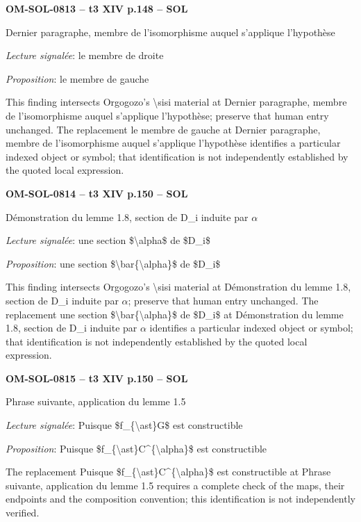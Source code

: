 \par\noindent\textbf{OM-SOL-0813 -- t3 XIV p.148 -- SOL}\par
Dernier paragraphe, membre de l'isomorphisme auquel s'applique l'hypothèse\par
\emph{Lecture signalée}: le membre de droite\par
\emph{Proposition}: le membre de gauche\par
This finding intersects Orgogozo's \textbackslash{}sisi material at Dernier paragraphe, membre de l'isomorphisme auquel s'applique l'hypothèse; preserve that human entry unchanged. The replacement le membre de gauche at Dernier paragraphe, membre de l'isomorphisme auquel s'applique l'hypothèse identifies a particular indexed object or symbol; that identification is not independently established by the quoted local expression.\par
\par\noindent\textbf{OM-SOL-0814 -- t3 XIV p.150 -- SOL}\par
Démonstration du lemme 1.8, section de D\_i induite par \ensuremath{\alpha}\par
\emph{Lecture signalée}: une section \$\textbackslash{}alpha\$ de \$D\_i\$\par
\emph{Proposition}: une section \$\textbackslash{}bar\{\textbackslash{}alpha\}\$ de \$D\_i\$\par
This finding intersects Orgogozo's \textbackslash{}sisi material at Démonstration du lemme 1.8, section de D\_i induite par \ensuremath{\alpha}; preserve that human entry unchanged. The replacement une section \$\textbackslash{}bar\{\textbackslash{}alpha\}\$ de \$D\_i\$ at Démonstration du lemme 1.8, section de D\_i induite par \ensuremath{\alpha} identifies a particular indexed object or symbol; that identification is not independently established by the quoted local expression.\par
\par\noindent\textbf{OM-SOL-0815 -- t3 XIV p.150 -- SOL}\par
Phrase suivante, application du lemme 1.5\par
\emph{Lecture signalée}: Puisque \$f\_\{\textbackslash{}ast\}G\$ est constructible\par
\emph{Proposition}: Puisque \$f\_\{\textbackslash{}ast\}C\textasciicircum{}\{\textbackslash{}alpha\}\$ est constructible\par
The replacement Puisque \$f\_\{\textbackslash{}ast\}C\textasciicircum{}\{\textbackslash{}alpha\}\$ est constructible at Phrase suivante, application du lemme 1.5 requires a complete check of the maps, their endpoints and the composition convention; this identification is not independently verified.\par
